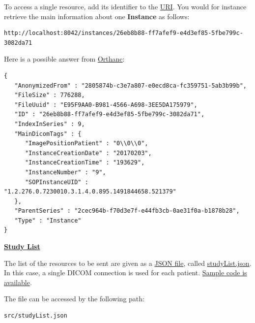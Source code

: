\documentclass{tufte-book} %
\begin{document}
\hfill

To access a single resource, add its identifier to the \href{https://en.wikipedia.org/wiki/Uniform_resource_identifier}{URI}. You would for instance retrieve the main information about one \textbf{Instance} as follows:

\begin{lstlisting}
http://localhost:8042/instances/26eb8b88-ff7afef9-e4d3ef85-5fbe799c-3082da71
\end{lstlisting}

\hfill

Here is a possible answer from \href{https://www.orthanc-server.com/}{Orthanc}:

\begin{lstlisting}
{
   "AnonymizedFrom" : "2805874b-c3e7a807-e0ecd8ca-fc359751-5ab3b99b",
   "FileSize" : 776288,
   "FileUuid" : "E95F9AA0-B981-4566-A698-3EE5DA175979",
   "ID" : "26eb8b88-ff7afef9-e4d3ef85-5fbe799c-3082da71",
   "IndexInSeries" : 9,
   "MainDicomTags" : {
      "ImagePositionPatient" : "0\\0\\0",
      "InstanceCreationDate" : "20170203",
      "InstanceCreationTime" : "193629",
      "InstanceNumber" : "9",
      "SOPInstanceUID" : "1.2.276.0.7230010.3.1.4.0.895.1491844658.521379"
   },
   "ParentSeries" : "2cec964b-f70d3e7f-e44fb3cb-0ae31f0a-b1878b28",
   "Type" : "Instance"
}
\end{lstlisting}


\clearpage


\href{https://github.com/MIMBCD-UI/prototype-cornerstone/wiki/Image-Processing#study-list}{\textbf{Study List}}

\hfill

The list of the resources to be sent are given as a \href{https://en.wikipedia.org/wiki/JSON}{JSON file}, called \href{https://github.com/MIMBCD-UI/prototype-cornerstone/blob/master/src/studyList.json}{studyList.json}. In this case, a single DICOM connection is used for each patient. \href{https://github.com/MIMBCD-UI/prototype-cornerstone/wiki/Image-Processing#study-list}{Sample code is available}.

\hfill

The file can be accessed by the following path:

\begin{lstlisting}
src/studyList.json
\end{lstlisting}
\end{document}
